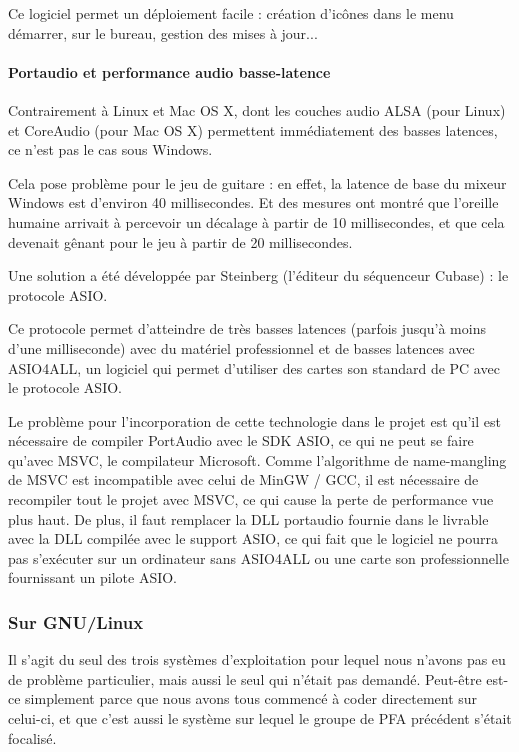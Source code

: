 Ce logiciel permet un déploiement facile : création d'icônes dans le menu démarrer, sur le bureau, gestion des mises à jour...

\paragraph{Portaudio et performance audio basse-latence}
Contrairement à Linux et Mac OS X, dont les couches audio ALSA (pour Linux) et CoreAudio (pour Mac OS X) permettent immédiatement
des basses latences, ce n'est pas le cas sous Windows.

Cela pose problème pour le jeu de guitare : en effet, la latence de base du mixeur Windows est d'environ 40 millisecondes.
Et des mesures ont montré que l'oreille humaine arrivait à percevoir un décalage à partir de 10 millisecondes, et que cela devenait gênant pour le jeu à partir de 20 millisecondes.

Une solution a été développée par Steinberg (l'éditeur du séquenceur Cubase) : le protocole ASIO.

Ce protocole permet d'atteindre de très basses latences (parfois jusqu'à moins d'une milliseconde) avec
du matériel professionnel et de basses latences avec ASIO4ALL, un logiciel qui permet d'utiliser des cartes son standard de PC avec le protocole ASIO.

Le problème pour l'incorporation de cette technologie dans le projet est qu'il est nécessaire de compiler PortAudio avec le SDK ASIO, ce qui
ne peut se faire qu'avec \ac{MSVC}, le compilateur Microsoft.
Comme l'algorithme de name-mangling de \ac{MSVC} est incompatible avec celui de MinGW / \ac{GCC}, il est nécessaire de recompiler tout le projet avec \ac{MSVC}, ce qui cause la perte de performance vue plus haut.
De plus, il faut remplacer la DLL portaudio fournie dans le livrable avec la DLL compilée avec le support ASIO, ce qui fait
que le logiciel ne pourra pas s'exécuter sur un ordinateur sans ASIO4ALL ou une carte son professionnelle fournissant un pilote ASIO.

\subsubsection*{Sur GNU/Linux}

Il s'agit du seul des trois systèmes d'exploitation pour lequel nous n'avons pas eu de problème particulier, mais aussi le seul qui n'était pas demandé. Peut-être est-ce simplement parce que nous avons tous commencé à coder directement sur celui-ci, et que c'est aussi le système sur lequel le groupe de PFA précédent s'était focalisé.

